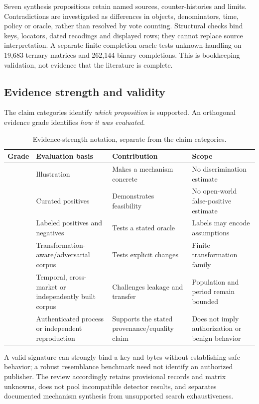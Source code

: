 Seven synthesis propositions retain named sources, counter-histories and limits. Contradictions are investigated as differences in objects, denominators, time, policy or oracle, rather than resolved by vote counting. Structural checks bind keys, locators, dated recodings and displayed rows; they cannot replace source interpretation. A separate finite completion oracle tests unknown-handling on 19,683 ternary matrices and 262,144 binary completions. This is bookkeeping validation, not evidence that the literature is complete.

\subsection{Evidence strength and validity}

The claim categories identify \emph{which proposition} is supported. An orthogonal evidence grade identifies \emph{how it was evaluated}.

\begin{table}[t]
\caption{Evidence-strength notation, separate from the claim categories.}
\label{tab:evidence-grades}
\small
\begin{tabularx}{\textwidth}{L{.85cm}L{2.85cm}Y Y}
\toprule
Grade & Evaluation basis & Contribution & Scope \\
\midrule
{} & Illustration & Makes a mechanism concrete & No discrimination estimate \\
 & Curated positives & Demonstrates feasibility & No open-world false-positive estimate \\
 & Labeled positives and negatives & Tests a stated oracle & Labels may encode assumptions \\
 & Transformation-aware/adversarial corpus & Tests explicit changes & Finite transformation family \\
 & Temporal, cross-market or independently built corpus & Challenges leakage and transfer & Population and period remain bounded \\
 & Authenticated process or independent reproduction & Supports the stated provenance/equality claim & Does not imply authorization or benign behavior \\
\bottomrule
\end{tabularx}
\end{table}

A valid signature can strongly bind a key and bytes without establishing safe behavior; a robust resemblance benchmark need not identify an authorized publisher. The review accordingly retains provisional records and matrix unknowns, does not pool incompatible detector results, and separates documented mechanism synthesis from unsupported search exhaustiveness.
